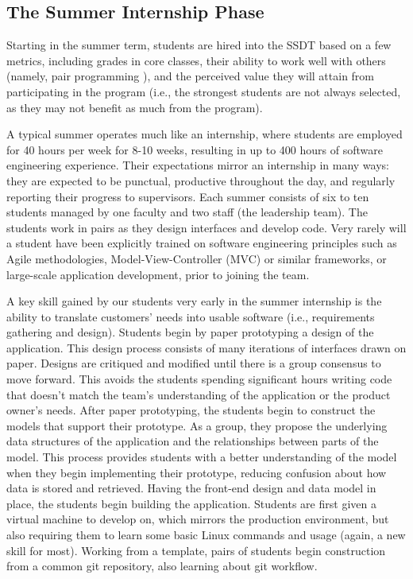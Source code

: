 \subsection{The Summer Internship Phase}
Starting in the summer term, students are hired into the SSDT based on a few metrics, including grades in core classes, their ability to work well with others (namely, pair programming \cite{2002PairProgramming}), and the perceived value they will attain from participating in the program (i.e., the strongest students are not always selected, as they may not benefit as much from the program).

A typical summer operates much like an internship, where students are employed for 40 hours per week for 8-10 weeks, resulting in up to 400 hours of software engineering experience. Their expectations mirror an internship in many ways: they are expected to be punctual, productive throughout the day, and regularly reporting their progress to supervisors. Each summer consists of six to ten students managed by one faculty and two staff (the leadership team). The students work in pairs as they design interfaces and develop code. Very rarely will a student have been explicitly trained on software engineering principles such as Agile methodologies, Model-View-Controller (MVC) or similar frameworks, or large-scale application development, prior to joining the team.

A key skill gained by our students very early in the summer internship is the ability to translate customers' needs into usable software (i.e., requirements gathering and design). Students begin by paper prototyping \cite{2003paperPrototype} a design of the application. This design process consists of many iterations of interfaces drawn on paper. Designs are critiqued and modified until there is a group consensus to move forward. This avoids the students spending significant hours writing code that doesn’t match the team’s understanding of the application or the product owner’s needs. After paper prototyping, the students begin to construct the models that support their prototype. As a group, they propose the underlying data structures of the application and the relationships between parts of the model. This process provides students with a better understanding of the model when they begin implementing their prototype, reducing confusion about how data is stored and retrieved. Having the front-end design and data model in place, the students begin building the application. Students are first given a virtual machine to develop on, which mirrors the production environment, but also requiring them to learn some basic Linux commands and usage (again, a new skill for most). Working from a template, pairs of students begin construction from a common git repository, also learning about git workflow.

